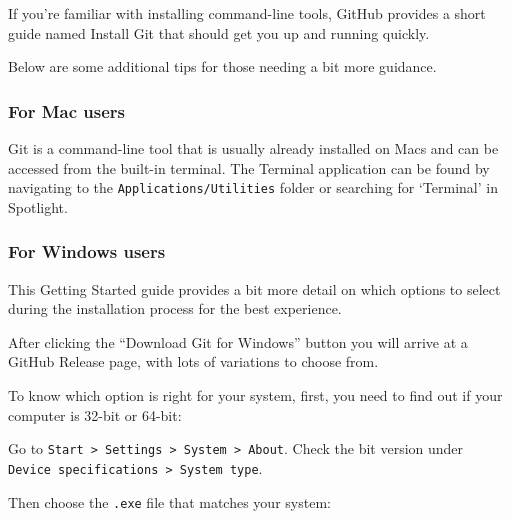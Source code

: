 \documentclass[
  letterpaper,
  DIV=11,
  numbers=noendperiod]{scrartcl}
\begin{document}
If you're familiar with installing command-line tools, GitHub provides a
short guide named Install Git that should get you up and running
quickly.

Below are some additional tips for those needing a bit more guidance.

\subsubsection{For Mac users}\label{for-mac-users}

Git is a command-line tool that is usually already installed on Macs and
can be accessed from the built-in terminal. The Terminal application can
be found by navigating to the \texttt{Applications/Utilities} folder or
searching for `Terminal' in Spotlight.

\subsubsection{For Windows users}\label{for-windows-users}

This Getting Started guide provides a bit more detail on which options
to select during the installation process for the best experience.

After clicking the ``Download Git for Windows'' button you will arrive
at a GitHub Release page, with lots of variations to choose from.

To know which option is right for your system, first, you need to find
out if your computer is 32-bit or 64-bit:

Go to
\texttt{Start\ \textgreater{}\ Settings\ \textgreater{}\ System\ \textgreater{}\ About}.
Check the bit version under
\texttt{Device\ specifications\ \textgreater{}\ System\ type}.

Then choose the \texttt{.exe} file that matches your system:
\end{document}
